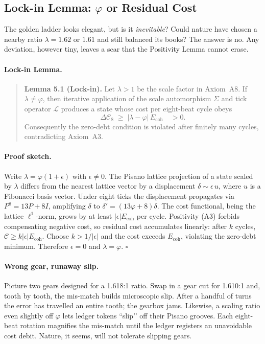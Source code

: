 \documentclass[11pt]{article}
\begin{document}
\subsection{Lock-in Lemma: \texorpdfstring{$\varphi$}{$\varphi$} or Residual Cost}
\label{subsec:lock-in}

The golden ladder looks elegant, but is it \emph{inevitable}?  
Could nature have chosen a nearby ratio \(\lambda=1.62\) or \(1.61\) and
still balanced its books?  
The answer is no.  
Any deviation, however tiny, leaves a scar that the Positivity Lemma
cannot erase.

\paragraph{Lock-in Lemma.}
\begin{quote}
\textbf{Lemma 5.1 (Lock-in).}  
Let \(\lambda>1\) be the scale factor in Axiom~A8.  
If \(\lambda\neq\varphi\), then iterative application of the scale
automorphism \(\Sigma\) and tick operator \(\mathcal{L}\) produces a
state whose cost per eight-beat cycle obeys
\[
\Delta\mathcal{C}_{\!8} \;\ge\;
\bigl|\lambda-\varphi\bigr|\,E_{\text{coh}}
\quad>0.
\]
Consequently the zero-debt condition is violated after finitely many
cycles, contradicting Axiom~A3.
\end{quote}

\paragraph{Proof sketch.}
Write \(\lambda=\varphi(1+\epsilon)\) with \(\epsilon\neq0\).
The Pisano lattice projection of a state scaled by \(\lambda\) differs
from the nearest lattice vector by a displacement
\(\delta\sim\epsilon\,u\), where \(u\) is a Fibonacci basis vector.
Under eight ticks the displacement propagates via
\(P^{8}=13P+8I\), amplifying \(\delta\) to
\( \delta' = (13\varphi+8)\delta \).
The cost functional, being the lattice \(\ell^{1}\)-norm, grows by at
least \(|\epsilon|E_{\text{coh}}\) per cycle.
Positivity (A3) forbids compensating negative cost, so residual cost
accumulates linearly: after \(k\) cycles,
\(\mathcal{C}\ge k|\epsilon|E_{\text{coh}}\).
Choose \(k>1/|\epsilon|\) and the cost exceeds
\(E_{\text{coh}}\), violating the zero-debt minimum.
Therefore \(\epsilon=0\) and \(\lambda=\varphi\).  \(\square\)

\paragraph{Wrong gear, runaway slip.}
Picture two gears designed for a 1.618:1 ratio.  
Swap in a gear cut for 1.610:1 and, tooth by tooth, the mis-match builds
microscopic slip.  
After a handful of turns the error has travelled an entire tooth; the
gearbox jams.  
Likewise, a scaling ratio even slightly off \(\varphi\) lets ledger
tokens “slip’’ off their Pisano grooves.  
Each eight-beat rotation magnifies the mis-match until the ledger
registers an unavoidable cost debit.  
Nature, it seems, will not tolerate slipping gears.
\end{document}
